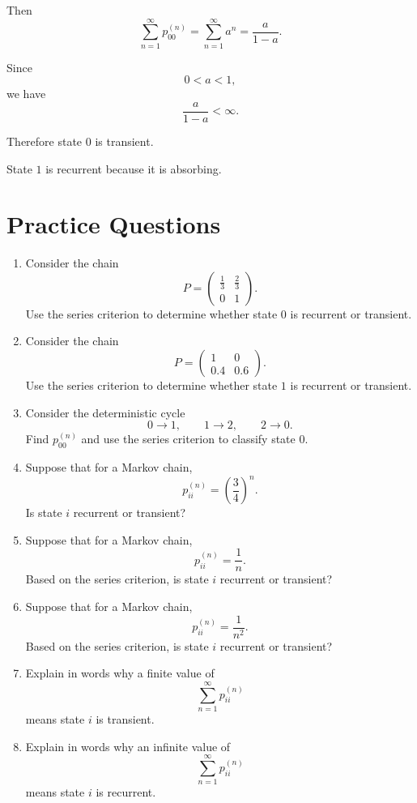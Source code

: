 \documentclass[12pt,a4paper]{article}
\theoremstyle{notestyle}
\begin{document}
Then
\[
\sum_{n=1}^{\infty}p_{00}^{(n)}
=
\sum_{n=1}^{\infty}a^n
=
\frac{a}{1-a}.
\]

Since
\[
0<a<1,
\]
we have
\[
\frac{a}{1-a}<\infty.
\]

Therefore state $0$ is transient.

State $1$ is recurrent because it is absorbing.

\section{Practice Questions}

\begin{enumerate}[label=\textbf{Q\arabic*.}, leftmargin=1.2cm]
    \item Consider the chain
    \[
    P=
    \begin{pmatrix}
    \frac13 & \frac23\\
    0 & 1
    \end{pmatrix}.
    \]
    Use the series criterion to determine whether state $0$ is recurrent or transient.

    \item Consider the chain
    \[
    P=
    \begin{pmatrix}
    1 & 0\\
    0.4 & 0.6
    \end{pmatrix}.
    \]
    Use the series criterion to determine whether state $1$ is recurrent or transient.

    \item Consider the deterministic cycle
    \[
    0\to 1,\qquad 1\to 2,\qquad 2\to 0.
    \]
    Find $p_{00}^{(n)}$ and use the series criterion to classify state $0$.

    \item Suppose that for a Markov chain,
    \[
    p_{ii}^{(n)}=\left(\frac34\right)^n.
    \]
    Is state $i$ recurrent or transient?

    \item Suppose that for a Markov chain,
    \[
    p_{ii}^{(n)}=\frac{1}{n}.
    \]
    Based on the series criterion, is state $i$ recurrent or transient?

    \item Suppose that for a Markov chain,
    \[
    p_{ii}^{(n)}=\frac{1}{n^2}.
    \]
    Based on the series criterion, is state $i$ recurrent or transient?

    \item Explain in words why a finite value of
    \[
    \sum_{n=1}^{\infty}p_{ii}^{(n)}
    \]
    means state $i$ is transient.

    \item Explain in words why an infinite value of
    \[
    \sum_{n=1}^{\infty}p_{ii}^{(n)}
    \]
    means state $i$ is recurrent.
\end{enumerate}
\end{document}
